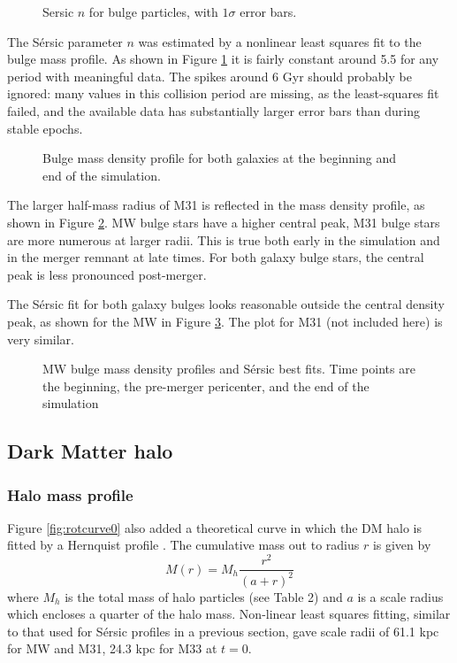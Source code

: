 \documentclass[twocolumn]{aastex63}
\begin{document}
\begin{figure}[bht!]
	\caption{Sersic $n$ for bulge particles, with $1\sigma$ error bars.
		\label{fig:sersic_n}}
\end{figure}

The Sérsic parameter $n$ was estimated by a nonlinear least squares fit to the bulge mass profile. As shown in Figure \ref{fig:sersic_n} it is fairly constant around 5.5 for any period with meaningful data. The spikes around 6 Gyr should probably be ignored: many values in this collision period are missing, as the least-squares fit failed, and the available data has substantially larger error bars than during stable epochs.

\begin{figure}[bht!]
	\caption{Bulge mass density profile for both galaxies at the beginning and end of the simulation.
		\label{fig:bulge_mp}}
\end{figure}

The larger half-mass radius of M31 is reflected in the mass density profile, as shown in Figure \ref{fig:bulge_mp}. MW bulge stars have a higher central peak, M31 bulge stars are more numerous at larger radii. This is true both early in the simulation and in the merger remnant at late times. For both galaxy bulge stars, the central peak is less pronounced post-merger.

The Sérsic fit for both galaxy bulges looks reasonable outside the central density peak, as shown for the MW in Figure \ref{fig:MW_bulge_sersic}. The plot for M31 (not included here) is very  similar.

\begin{figure}[bht!]
	\caption{MW bulge mass density profiles and Sérsic best fits. Time points are the beginning, the pre-merger pericenter, and the end of the simulation
		\label{fig:MW_bulge_sersic}}
\end{figure}

\subsection{Dark Matter halo}

\subsubsection{Halo mass profile}

Figure \ref{fig:rotcurve0} also added a theoretical curve in which the DM halo is fitted by a Hernquist profile \citep{hernquist_analytical_1990}. The cumulative mass out to radius $r$ is given by
\[ M(r) = M_h \frac{r^2}{(a+r)^2} \]
where $M_h$ is the total mass of halo particles (see Table 2) and $a$ is a scale radius which encloses a quarter of the halo mass. Non-linear least squares fitting, similar to that used for Sérsic profiles in a previous section, gave scale radii of 61.1 kpc for MW and M31, 24.3 kpc for M33 at $t=0$.
\end{document}
